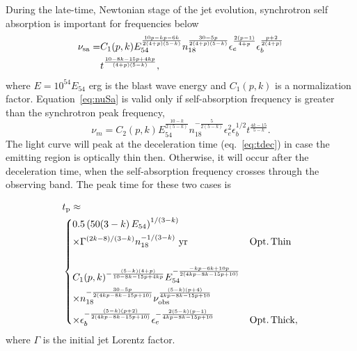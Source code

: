 \documentclass[usenatbib,fleqn]{mnras}
\begin{document}
During the late-time, Newtonian stage of the jet evolution,
synchrotron self absorption is important for frequencies below
\begin{align}
  \nu_{\rm sa}=&C_1(p, k) E_{54}^{\frac{10 p-k p -6 k}{2 (4+p) (5-k)}}
  n_{18}^{\frac{30 - 5 p}{2 (4 + p) (5 - k)}}
  \epsilon_e^{\frac{2 (p-1)}{4+p}} \epsilon_b^{\frac{p+2}{2 (4+p)}}\nonumber\\
  &t^{\frac{10 - 8 k - 15 p + 4 k p}{(4 + p) (5 - k)}},
\label{eq:nuSa} 
\end{align}
%
where $E = 10^{54}E_{54}$ erg is the blast wave energy and $C_1(p, k)$
is a normalization factor.  Equation~\eqref{eq:nuSa} is valid only if
self-absorption frequency is greater than the synchrotron peak
frequency,
\begin{equation}
\nu_m=C_2(p, k) E_{54}^{\frac{10-k}{2 (5-k)}} n_{18}^{-\frac{5}{2
    (5-k)}}  \epsilon_e^2  \epsilon_b^{1/2}  t^{\frac{4 k-15}{5-k}}.
\label{eq:num}
\end{equation}
%
The light curve will peak at the deceleration time (eq.~\ref{eq:tdec})
in case the emitting region is optically thin then. Otherwise, it will
occur after the deceleration time, when the self-absorption frequency
crosses through the observing band. The peak time for these two cases
is

\begin{align}
&t_{\rm p} \approx\nonumber\\
&\begin{dcases}
  0.5 \left(50 (3-k) \, E_{54}\right)^{1/(3-k)} \\\times\Gamma^{(2k - 8)/(3-k)}
  n_{18}^{-1/(3-k)} \,\,{\rm yr} & {\rm Opt.\, Thin}\\\\
  C_1(p, k)^{-\frac{(5 - k) (4 + p)}{10 - 8 k - 15 p + 4 k
      p}}E_{54}^{-\frac{-k p-6 k+10 p}{2 (4 k p-8 k-15 p+10)}}\\
  \times n_{18}^{-\frac{30-5 p}{2 (4 k p-8 k-15 p+10)}} \nu_{\rm
    obs}^{\frac{(5-k) (p+4)}{4 k p-8 k-15 p+10}}\\
  \times \epsilon_b^{-\frac{(5-k) (p+2)}{2 (4 k p-8 k-15 p+10)}}
  \epsilon_e^{-\frac{2 (5-k) (p-1)}{4 k p-8 k-15 p+10}} & {\rm Opt.\,
    Thick},
\end{dcases}
\label{eq:tpeakGen}
\end{align}
%
where $\Gamma$ is the initial jet Lorentz factor. 
\end{document}
